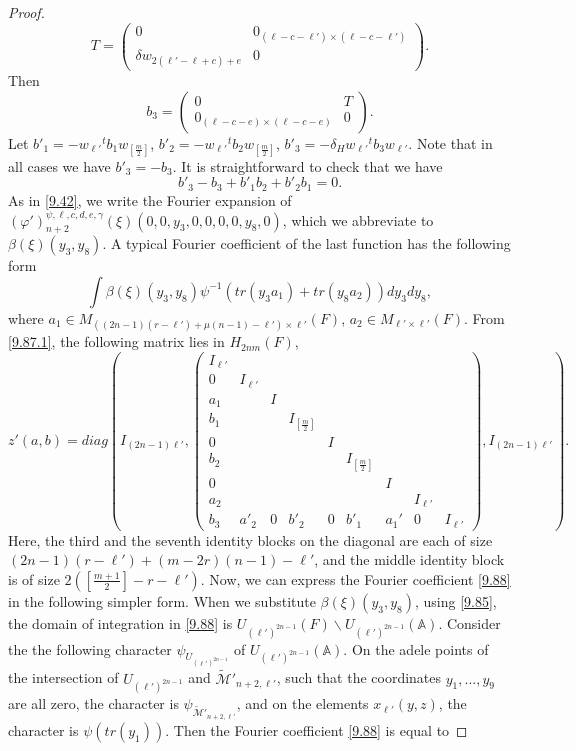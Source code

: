 \documentclass[12pts]{amsart}
\newcommand{\BA}{{\mathbb {A}}}
\begin{document}
\begin{proof}
$$
T=\begin{pmatrix}0&0_{(\ell-c-\ell')\times(\ell-c-\ell')}\\\delta w_{2(\ell'-\ell+c)+e}&0\end{pmatrix}.
$$
Then 
$$
b_3=\begin{pmatrix}0&T\\0_{(\ell-c-e)\times (\ell-c-e)}&0\end{pmatrix}.
$$
Let $b'_1=-w_{\ell'}{}^tb_1w_{[\frac{m}{2}]}$, $b'_2=-w_{\ell'}{}^tb_2w_{[\frac{m}{2}]}$, $b'_3=-\delta_Hw_{\ell'}{}^tb_3w_{\ell'}$. Note that in all cases we have $b'_3=-b_3$. It is straightforward to check that we have
	\begin{equation}\label{9.87.1}
	b'_3-b_3+b'_1b_2+b'_2b_1=0.
	\end{equation}
As in \eqref{9.42}, we write the Fourier expansion of $(\varphi')_{n+2}^{\psi,\ell,c,d,e,\gamma}(\xi)(0,0,y_3,0,0,0,0,y_8,0)$, which we abbreviate to $\beta(\xi)(y_3,y_8)$.
A typical Fourier coefficient of the last function has the following form
\begin{equation}\label{9.88}
\int \beta(\xi)(y_3,y_8)\psi^{-1}(tr(y_3a_1)+tr(y_8a_2))dy_3dy_8,
\end{equation}
where $a_1\in  M_{((2n-1)(r-\ell')+\mu(n-1)-\ell')\times\ell'}(F)$, $a_2\in M_{\ell'\times \ell'}(F)$. From \eqref{9.87.1}, the following matrix lies in $H_{2nm}(F)$,
$$
z'(a,b)=diag(I_{(2n-1)\ell'},\begin{pmatrix}I_{\ell'}\\0&I_{\ell'}\\a_1&&I\\b_1&&&I_{[\frac{m}{2}]}\\0&&&&I\\b_2&&&&&I_{[\frac{m}{2}]}\\0&&&&&&I\\a_2&&&&&&&I_{\ell'}\\b_3&a'_2&0&b'_2&0&b'_1&a_1'&0&I_{\ell'}\end{pmatrix},I_{(2n-1)\ell'}).
$$
Here, the third and the seventh identity blocks on the diagonal are each of size $(2n-1)(r-\ell')+(m-2r)(n-1)-\ell'$, and the middle identity block is of size $2([\frac{m+1}{2}]-r-\ell')$. Now, we can express the Fourier coefficient \eqref{9.88} in the following simpler form. When we substitute $\beta(\xi)(y_3,y_8)$, using \eqref{9.85}, the domain of integration in \eqref{9.88} is $U_{(\ell')^{2n-1}}(F)\backslash U_{(\ell')^{2n-1}}(\BA)$. Consider the the following character $\psi_{U_{(\ell')^{2n-1}}}$ of $U_{(\ell')^{2n-1}}(\BA)$. On the adele points of the intersection of $U_{(\ell')^{2n-1}}$ and $\tilde{\mathcal{M}}'_{n+2,\ell'}$, such that the coordinates $y_1,...,y_9$ are all zero, the character is $\psi_{\tilde{\mathcal{M}}'_{n+2,\ell'}}$, and on the elements $x_{\ell'}(y,z)$, the character is $\psi(tr(y_1))$. Then the Fourier coefficient \eqref{9.88} is equal to

\end{proof}
\end{document}
